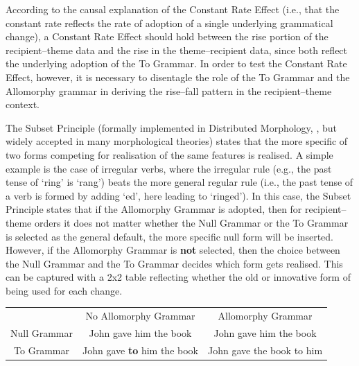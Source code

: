 	According to the causal explanation of the Constant Rate Effect (i.e., that the constant rate reflects the rate of adoption of a single underlying grammatical change), a Constant Rate Effect should hold between the rise portion of the recipient--theme data and the rise in the theme--recipient data, since both reflect the underlying adoption of the To Grammar. In order to test the Constant Rate Effect, however, it is necessary to disentagle the role of the To Grammar and the Allomorphy grammar in deriving the rise--fall pattern in the recipient--theme context. 

	The Subset Principle (formally implemented in Distributed Morphology, \citealt{Halle.1993}, but widely accepted in many morphological theories) states that the more specific of two forms competing for realisation of the same features is realised. A simple example is the case of irregular verbs, where the irregular rule (e.g., the past tense of `ring' is `rang') beats the more general regular rule (i.e., the past tense of a verb is formed by adding `ed', here leading to `ringed'). In this case, the Subset Principle states that if the Allomorphy Grammar is adopted, then for recipient--theme orders it does not matter whether the Null Grammar or the To Grammar is selected as the general default, the more specific null form will be inserted. However, if the Allomorphy Grammar is \textbf{not} selected, then the choice between the Null Grammar and the To Grammar decides which form gets realised. This can be captured with a 2x2 table reflecting whether the old or innovative form of being used for each change.

	\begin{table}
		\begin{tabular}{ccc}
					& No Allomorphy Grammar & Allomorphy Grammar\\
			Null Grammar	& John gave him the book & John gave him the book\\
			To Grammar	& John gave \textbf{to} him the book & John gave the book to him\\
		\end{tabular}
		\label{tab:2x2int}
	\end{table}

